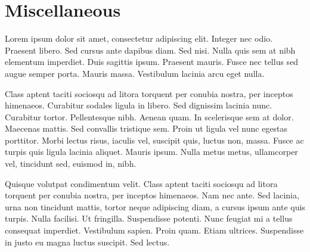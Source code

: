 \documentclass[12pt, draft]{book}
\begin{document}
\chapter{Miscellaneous}\label{chapter3}
Lorem ipsum dolor sit amet, consectetur adipiscing elit. Integer nec odio. Praesent libero. Sed cursus ante dapibus diam. Sed nisi. Nulla quis sem at nibh elementum imperdiet. Duis sagittis ipsum. Praesent mauris. Fusce nec tellus sed augue semper porta. Mauris massa. Vestibulum lacinia arcu eget nulla. 

Class aptent taciti sociosqu ad litora torquent per conubia nostra, per inceptos himenaeos. Curabitur sodales ligula in libero. Sed dignissim lacinia nunc. Curabitur tortor. Pellentesque nibh. Aenean quam. In scelerisque sem at dolor. Maecenas mattis. Sed convallis tristique sem. Proin ut ligula vel nunc egestas porttitor. Morbi lectus risus, iaculis vel, suscipit quis, luctus non, massa. Fusce ac turpis quis ligula lacinia aliquet. Mauris ipsum. Nulla metus metus, ullamcorper vel, tincidunt sed, euismod in, nibh. 

Quisque volutpat condimentum velit. Class aptent taciti sociosqu ad litora torquent per conubia nostra, per inceptos himenaeos. Nam nec ante. Sed lacinia, urna non tincidunt mattis, tortor neque adipiscing diam, a cursus ipsum ante quis turpis. Nulla facilisi. Ut fringilla. Suspendisse potenti. Nunc feugiat mi a tellus consequat imperdiet. Vestibulum sapien. Proin quam. Etiam ultrices. Suspendisse in justo eu magna luctus suscipit. Sed lectus. 
\newpage

\newpage

\newpage

\newpage
%


\newpage

\end{document}
